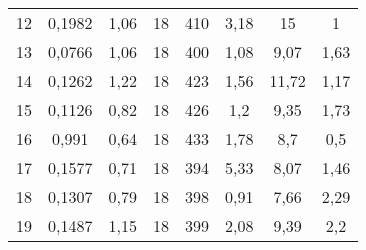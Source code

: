 \documentclass[12pt,a4paper]{article}
\begin{document}
\begin{table}[]
{\begin{tabular}{|c|c|c|c|c|c|c|c|}
    12                       & 0,1982                 & 1,06                       & 18                                         & 410                       & 3,18                                            & 15                                       & 1                                     \\
    13                       & 0,0766                 & 1,06                       & 18                                         & 400                       & 1,08                                            & 9,07                                     & 1,63                                  \\
    14                       & 0,1262                 & 1,22                       & 18                                         & 423                       & 1,56                                            & 11,72                                    & 1,17                                  \\
    15                       & 0,1126                 & 0,82                       & 18                                         & 426                       & 1,2                                             & 9,35                                     & 1,73                                  \\
    16                       & 0,991                  & 0,64                       & 18                                         & 433                       & 1,78                                            & 8,7                                      & 0,5                                   \\
    17                       & 0,1577                 & 0,71                       & 18                                         & 394                       & 5,33                                            & 8,07                                     & 1,46                                  \\
    18                       & 0,1307                 & 0,79                       & 18                                         & 398                       & 0,91                                            & 7,66                                     & 2,29                                  \\
    19                       & 0,1487                 & 1,15                       & 18                                         & 399                       & 2,08                                            & 9,39                                     & 2,2                                   \\

\end{tabular}}
\end{table}
\end{document}
